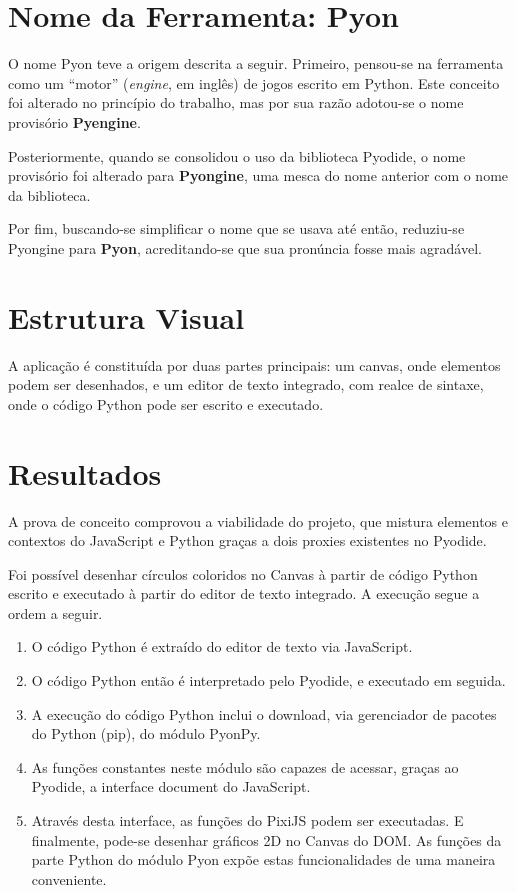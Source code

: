\begin{apendicesenv}
\section{Nome da Ferramenta: Pyon}

O nome Pyon teve a origem descrita a seguir. Primeiro, pensou-se na ferramenta como um ``motor''
(\textit{engine}, em inglês) de jogos escrito em Python. Este conceito foi alterado no princípio do trabalho, mas por sua razão adotou-se o nome provisório \textbf{Pyengine}.

Posteriormente, quando se consolidou o uso da biblioteca Pyodide, o nome provisório foi alterado para
\textbf{Pyongine}, uma mesca do nome anterior com o nome da biblioteca.

Por fim, buscando-se simplificar o nome que se usava até então, reduziu-se Pyongine para \textbf{Pyon},
acreditando-se que sua pronúncia fosse mais agradável.

\section{Estrutura Visual}

A aplicação é constituída por duas partes principais: um canvas, onde elementos podem ser desenhados, e um editor de texto integrado, com realce de sintaxe, onde o código Python pode ser escrito e executado.

\section{Resultados}

A prova de conceito comprovou a viabilidade do projeto, que mistura elementos e contextos do JavaScript e Python graças a dois proxies existentes no Pyodide.

Foi possível desenhar círculos coloridos no Canvas à partir de código Python escrito e executado à partir do editor de texto integrado. A execução segue a ordem a seguir.

\begin{enumerate}
    \item O código Python é extraído do editor de texto via JavaScript.
    \item O código Python então é interpretado pelo Pyodide, e executado em seguida.
    \item A execução do código Python inclui o download, via gerenciador de pacotes do Python (pip), do módulo PyonPy.
    \item As funções constantes neste módulo são capazes de acessar, graças ao Pyodide, a interface
    document do JavaScript.
    \item Através desta interface, as funções do PixiJS podem ser executadas. E finalmente, pode-se desenhar gráficos 2D no Canvas do DOM. As funções da parte Python do módulo Pyon expõe estas funcionalidades de uma maneira conveniente.
\end{enumerate}

\end{apendicesenv}
